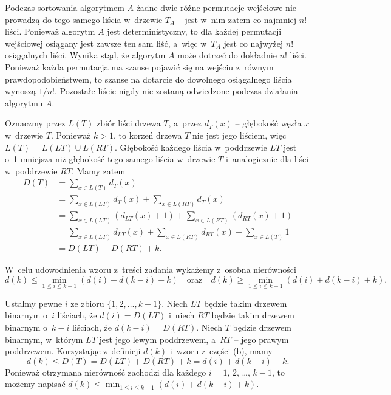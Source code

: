 
\subproblem %
Podczas sortowania algorytmem $A$ żadne dwie różne permutacje wejściowe nie prowadzą do tego samego liścia w~drzewie $T_A$ -- jest w~nim zatem co najmniej $n!$ liści.
Ponieważ algorytm $A$ jest deterministyczny, to dla każdej permutacji wejściowej osiągany jest zawsze ten sam liść, a~więc w~$T_A$ jest co najwyżej $n!$ osiągalnych liści.
Wynika stąd, że algorytm $A$ może dotrzeć do dokładnie $n!$ liści.
Ponieważ każda permutacja ma szanse pojawić się na wejściu z~równym prawdopodobieństwem, to szanse na dotarcie do dowolnego osiągalnego liścia wynoszą $1/n!$.
Pozostałe liście nigdy nie zostaną odwiedzone podczas działania algorytmu $A$.

\subproblem %
Oznaczmy przez $L(T)$ zbiór liści drzewa $T$, a~przez $d_T(x)$ -- głębokość węzła $x$ w~drzewie $T$.
Ponieważ $k>1$, to korzeń drzewa $T$ nie jest jego liściem, więc $L(T)=L(LT)\cup L(RT)$.
Głębokość każdego liścia w~poddrzewie $LT$ jest o~1 mniejsza niż głębokość tego samego liścia w~drzewie $T$ i~analogicznie dla liści w~poddrzewie $RT$.
Mamy zatem
\begin{align*}
    D(T) &= \sum_{x\in L(T)}d_T(x) \\
	&= \sum_{x\in L(LT)}d_T(x)+\sum_{x\in L(RT)}d_T(x) \\
	&= \sum_{x\in L(LT)}(d_{LT}(x)+1)+\sum_{x\in L(RT)}(d_{RT}(x)+1) \\
	&= \sum_{x\in L(LT)}d_{LT}(x)+\sum_{x\in L(RT)}d_{RT}(x)+\sum_{x\in L(T)}1 \\[1mm]
	&= D(LT)+D(RT)+k.
\end{align*}

\subproblem %

\noindent W~celu udowodnienia wzoru z~treści zadania wykażemy z~osobna nierówności
\[
    d(k) \le \min_{1\le i\le k-1}(d(i)+d(k-i)+k) \quad\text{oraz}\quad d(k) \ge \min_{1\le i\le k-1}(d(i)+d(k-i)+k).
\]

Ustalmy pewne $i$ ze zbioru $\{1,2,\dots,k-1\}$.
Niech $LT$ będzie takim drzewem binarnym o~$i$ liściach, że $d(i)=D(LT)$ i~niech $RT$ będzie takim drzewem binarnym o~$k-i$ liściach, że $d(k-i)=D(RT)$.
Niech $T$ będzie drzewem binarnym, w~którym $LT$ jest jego lewym poddrzewem, a~$RT$ -- jego prawym poddrzewem.
Korzystając z~definicji $d(k)$ i~wzoru z~części (b), mamy
\[
    d(k) \le D(T) = D(LT)+D(RT)+k = d(i)+d(k-i)+k.
\]
Ponieważ otrzymana nierówność zachodzi dla każdego $i=1$, 2, \dots, $k-1$, to możemy napisać $d(k)\le\min_{1\le i\le k-1}(d(i)+d(k-i)+k)$.


